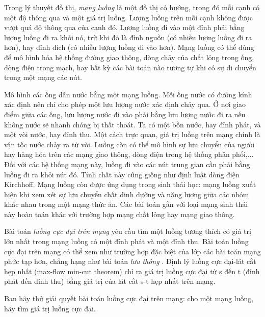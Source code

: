 Trong lý thuyết đồ thị,   \emph{    mạng luồng   }   là một đồ thị có hướng, trong đó mỗi cạnh có một độ thông qua và một giá trị luồng. Lượng luồng trên mỗi cạnh không được vượt quá độ thông qua của cạnh đó.   Lượng luồng đi vào một đỉnh phải bằng lượng luồng đi ra khỏi nó, trừ khi đó là đỉnh nguồn (có nhiều lượng luồng đi ra hơn), hay đỉnh đích (có nhiều lượng luồng đi vào hơn). Mạng luồng có thể dùng để mô   hình hóa hệ thống đường giao thông, dòng chảy của chất lỏng trong ống, dòng điện trong mạch, hay bất kỳ các bài toán nào tương tự khi có sự di chuyển trong một mạng các nút.  

   Mô hình các ống dẫn nước bằng một mạng luồng. Mỗi ống nước có đường kính xác định nên chỉ cho phép một lưu lượng nước xác định chảy qua. Ở nơi giao điểm giữa các ống, lưu lượng nước đi vào   phải bằng lưu lượng nước đi ra nếu không nước sẽ nhanh chóng bị thất thoát. Ta có một bồn nước, hay đỉnh phát, và một vòi nước, hay đỉnh thu. Một cách trực quan, giá trị luồng trên mạng chính là vận tốc   nước chảy ra từ vòi. Luồng còn có thể mô hình sự lưu chuyển của người hay hàng hóa trên các mạng giao thông, dòng điện trong hệ thống phân phối,... Đối với các hệ thống mạng này, luồng đi vào các nút   trung gian cần phải bằng luồng đi ra khỏi nút đó. Tính chất này cũng giống như định luật dòng điện Kirchhoff. Mạng luồng còn được ứng dụng trong sinh thái học: mạng luồng xuất hiện khi xem xét sự lưu   chuyển chất dinh dưỡng và năng lượng giữa các nhóm khác nhau trong một mạng thức ăn. Các bài toán gắn với loại mạng sinh thái này hoàn toán khác với trường hợp mạng chất lỏng hay mạng giao thông.  

   Bài toán   \emph{    luồng cực đại trên mạng   }   yêu cầu tìm một luồng tương thích có giá trị lớn nhất trong mạng luồng có một đỉnh phát và một đỉnh thu. Bài toán luồng cực đại trên mạng có thể xem như trường   hợp đặc biệt của lớp các bài toán mạng phức tạp hơn, chẳng hạng như bài toán   \emph{    lưu thông   }   . Định lý luồng cực đại-lát cắt hẹp nhất (max-flow min-cut theorem) chỉ ra giá trị luồng cực đại từ s đến t (đỉnh   phát đến đỉnh thu) bằng giá trị của lát cắt s-t hẹp nhất trên mạng.  

   Bạn hãy thử giải quyết bài toán luồng cực đại trên mạng: cho một mạng luồng, hãy tìm giá trị luồng cực đại.  

\